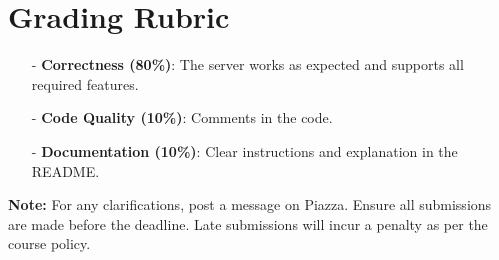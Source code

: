 \documentclass[12pt,a4paper]{article}
\begin{document}
\section*{Grading Rubric}
\begin{itemize}
    \item[-] \textbf{Correctness (80\%)}: The server works as expected and supports all required features.
    \item[-] \textbf{Code Quality (10\%)}: Comments in the code.
    \item[-] \textbf{Documentation (10\%)}: Clear instructions and explanation in the README.
\end{itemize}

\vfill
\noindent \textbf{Note:} For any clarifications, post a message on Piazza. Ensure all submissions are made before the deadline. Late submissions will incur a penalty as per the course policy.
\end{document}
